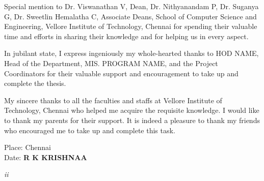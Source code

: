 \documentclass[12pt,a4paper]{report}
\begin{document}
Special mention to Dr. Viswanathan V, Dean, Dr. Nithyanandam P, Dr. Suganya
G, Dr. Sweetlin Hemalatha C, Associate Deans, School of Computer Science and
Engineering, Vellore Institute of Technology, Chennai for spending their valuable
time and efforts in sharing their knowledge and for helping us in every aspect.

In jubilant state, I express ingeniously my whole-hearted thanks to
HOD NAME, Head of the Department, MIS. PROGRAM NAME, and the Project Coordinators for their valuable support and encouragement to take
up and complete the thesis.

My sincere thanks to all the faculties and staffs at Vellore Institute of Technology,
Chennai who helped me acquire the requisite knowledge. I would like to thank my
parents for their support. It is indeed a pleasure to thank my friends who
encouraged me to take up and complete this task.

\vspace{2cm}

\noindent Place: Chennai\\
Date: \hspace{4cm}
\hspace{6.5cm}\textbf{R K KRISHNAA}

\begin{center}
\textit{ii}
\end{center}


\newpage

\tableofcontents
\newpage

\listoffigures
\newpage

\listoftables
\newpage

%
%
\end{document}
